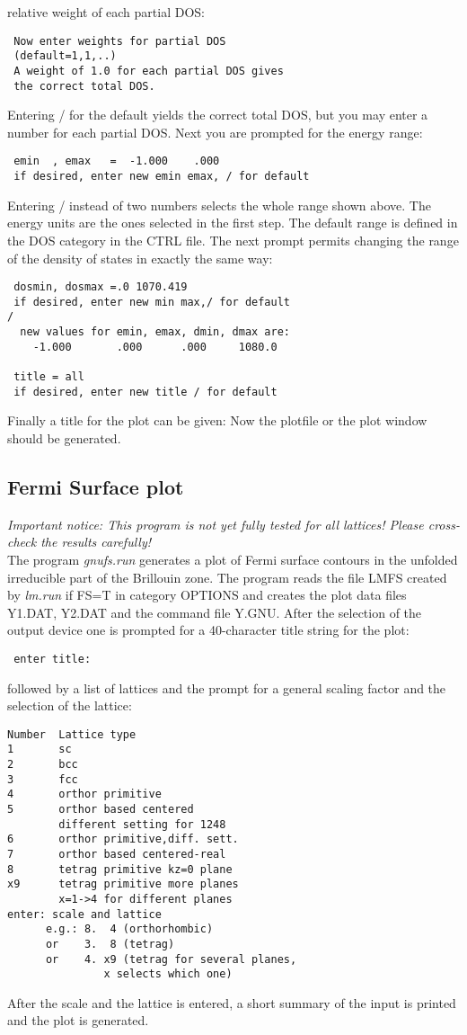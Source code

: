 \documentclass[aps,twocolumn,a4]{revtex4}
\begin{document}
relative weight of each partial DOS:
\begin{verbatim}
 Now enter weights for partial DOS
 (default=1,1,..)
 A weight of 1.0 for each partial DOS gives
 the correct total DOS.
\end{verbatim}
Entering / for the default yields the correct total DOS, but you may enter a
number for each partial DOS.
Next you are prompted for the energy range:
\begin{verbatim}
 emin  , emax   =  -1.000    .000
 if desired, enter new emin emax, / for default
\end{verbatim}
Entering / instead of two numbers selects the whole range shown above.
The energy units are the ones selected in the first step. The default
range is defined in the DOS category in the CTRL file.
The next prompt permits changing the range of the density of states
in exactly the same way:
\begin{verbatim}
 dosmin, dosmax =.0 1070.419
 if desired, enter new min max,/ for default
/
  new values for emin, emax, dmin, dmax are:
    -1.000       .000      .000     1080.0

 title = all
 if desired, enter new title / for default
\end{verbatim}
Finally a title for the plot can be given:
Now the plotfile or the plot window should be generated.
\subsection {Fermi Surface plot}
\label{fsplot}
{\it Important notice: This program is not yet fully tested for all lattices!
     Please cross-check the results carefully!}\\

The program {\it gnufs.run} generates a plot of Fermi surface
contours in the unfolded
irreducible part of the Brillouin zone.
The program reads the file LMFS created by {\it lm.run} if FS=T in category
OPTIONS and creates the plot data files Y1.DAT, Y2.DAT and the command
file Y.GNU.
After the selection of the output device one is prompted for a
40-character title string for the plot:
\begin{verbatim}
 enter title:
\end{verbatim}
followed by a list of lattices and the prompt for a general
scaling factor and the selection of the lattice:
\begin{verbatim}
Number  Lattice type
1       sc
2       bcc
3       fcc
4       orthor primitive
5       orthor based centered
        different setting for 1248
6       orthor primitive,diff. sett.
7       orthor based centered-real
8       tetrag primitive kz=0 plane
x9      tetrag primitive more planes
        x=1->4 for different planes
enter: scale and lattice
      e.g.: 8.  4 (orthorhombic)
      or    3.  8 (tetrag)
      or    4. x9 (tetrag for several planes,
               x selects which one)
\end{verbatim}
After the scale and the lattice is entered, a short summary of the
input is printed and the plot is generated.
\end{document}
